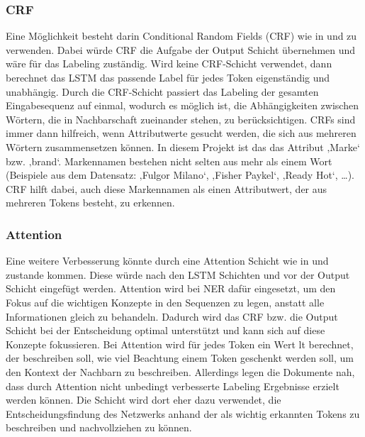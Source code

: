 \documentclass[paper=a4,12pt,listof=totoc]{scrartcl}%
\begin{document}
	\subsubsection{CRF}
	Eine Möglichkeit besteht darin Conditional Random Fields (CRF) wie in \cite{Majumder.2018} und \cite{Zheng.2018} zu verwenden. Dabei würde CRF die Aufgabe der Output Schicht übernehmen und wäre für das Labeling zuständig. Wird keine CRF-Schicht verwendet, dann berechnet das LSTM das passende Label für jedes Token eigenständig und unabhängig. Durch die CRF-Schicht passiert das Labeling der gesamten Eingabesequenz auf einmal, wodurch es möglich ist, die Abhängigkeiten zwischen Wörtern, die in Nachbarschaft zueinander stehen, zu berücksichtigen. CRFs sind immer dann hilfreich, wenn Attributwerte gesucht werden, die sich aus mehreren Wörtern zusammensetzen können. In diesem Projekt ist das das Attribut ‚Marke‘ bzw. ‚brand‘. Markennamen bestehen nicht selten aus mehr als einem Wort (Beispiele aus dem Datensatz: ‚Fulgor Milano‘, ‚Fisher Paykel‘, ‚Ready Hot‘, …). CRF hilft dabei, auch diese Markennamen als einen Attributwert, der aus mehreren Tokens besteht, zu erkennen. 
	
	\subsubsection{Attention}
	Eine weitere Verbesserung könnte durch eine Attention Schicht wie in \cite{Majumder.2018} und \cite{Zheng.2018} zustande kommen. Diese würde nach den LSTM Schichten und vor der Output Schicht eingefügt werden. Attention wird bei NER dafür eingesetzt, um den Fokus auf die wichtigen Konzepte in den Sequenzen zu legen, anstatt alle Informationen gleich zu behandeln. Dadurch wird das CRF bzw. die Output Schicht bei der Entscheidung optimal unterstützt und kann sich auf diese Konzepte fokussieren. Bei Attention wird für jedes Token ein Wert lt berechnet, der beschreiben soll, wie viel Beachtung einem Token geschenkt werden soll, um den Kontext der Nachbarn zu beschreiben. 
	Allerdings legen die Dokumente nah, dass durch Attention nicht unbedingt verbesserte Labeling Ergebnisse erzielt werden können. Die Schicht wird dort eher dazu verwendet, die Entscheidungsfindung des Netzwerks anhand der als wichtig erkannten Tokens zu beschreiben und nachvollziehen zu können. 
	
	
	\printbibliography[title=Literaturverzeichnis]
\end{document}
